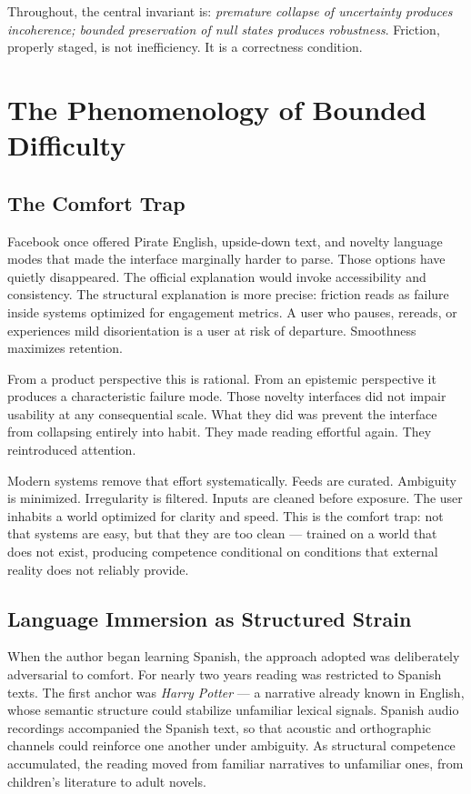 \documentclass[11pt]{article}
\theoremstyle{remark}
\begin{document}
Throughout, the central invariant is: \emph{premature collapse of uncertainty produces incoherence; bounded preservation of null states produces robustness}. Friction, properly staged, is not inefficiency. It is a correctness condition.

\section{The Phenomenology of Bounded Difficulty}
\label{sec:phenomenology}

\subsection{The Comfort Trap}

Facebook once offered Pirate English, upside-down text, and novelty language modes that made the interface marginally harder to parse. Those options have quietly disappeared. The official explanation would invoke accessibility and consistency. The structural explanation is more precise: friction reads as failure inside systems optimized for engagement metrics. A user who pauses, rereads, or experiences mild disorientation is a user at risk of departure. Smoothness maximizes retention.

From a product perspective this is rational. From an epistemic perspective it produces a characteristic failure mode. Those novelty interfaces did not impair usability at any consequential scale. What they did was prevent the interface from collapsing entirely into habit. They made reading effortful again. They reintroduced attention.

Modern systems remove that effort systematically. Feeds are curated. Ambiguity is minimized. Irregularity is filtered. Inputs are cleaned before exposure. The user inhabits a world optimized for clarity and speed. This is the comfort trap: not that systems are easy, but that they are too clean — trained on a world that does not exist, producing competence conditional on conditions that external reality does not reliably provide.

\subsection{Language Immersion as Structured Strain}

When the author began learning Spanish, the approach adopted was deliberately adversarial to comfort. For nearly two years reading was restricted to Spanish texts. The first anchor was \emph{Harry Potter} — a narrative already known in English, whose semantic structure could stabilize unfamiliar lexical signals. Spanish audio recordings accompanied the Spanish text, so that acoustic and orthographic channels could reinforce one another under ambiguity. As structural competence accumulated, the reading moved from familiar narratives to unfamiliar ones, from children's literature to adult novels.
\end{document}
